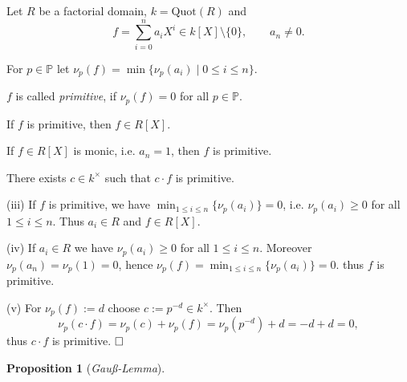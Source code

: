 \documentclass[11pt]{book}
\newtheorem{proposition}[theorem]{Proposition}
\theoremstyle{nonumberbreak}
\newenvironment{pr}[1][]{\ifthenelse{\equal{#1}{}}{\proof}{\proof[#1]}\rm}{\endproof}
\newenvironment{definprop}[1][]{\ifthenelse{\equal{#1}{}}{\definiprop}{\definiprop[#1]}\rm}{\enddefiniprop}
\begin{document}
\begin{spacing}{1.3}
\begin{definprop} %
Let $R$ be a factorial domain, $k=\textrm{Quot}(R)$ and $$f = \sum_{i=0}^n a_i X^{i} \in k[X] \setminus \{0\}, \qquad a_n \neq 0.$$
\begin{compactenum}
\item For $p \in \mathbb{P}$ let $\nu_p(f)= \min\{\nu_p(a_i) \mid 0 \leqslant i \leqslant n\}$.
\item $f$ is called \textit{primitive}, if $\nu_p(f)=0$ for all $p \in \mathbb{P}$. 
\item If $f$ is primitive, then $f \in R[X]$.
\item If $f \in R[X]$ is monic, i.e. $a_n=1$, then $f$ is primitive.
\item There exists $c \in k^{\times}$ such that $c \cdot f$ is primitive.
\end{compactenum}
\begin{pr}
\begin{compactenum}
\item[(iii)] If $f$ is primitive, we have $\min_{1\leqslant i \leqslant n}\{\nu_p(a_i)\}=0$, i.e. $\nu_p(a_i) \geqslant 0$ for all $1 \leqslant i \leqslant n$. Thus $a_i \in R$ and $f \in R[X]$.
\item[(iv)] If $a_i \in R$ we have $\nu_p(a_i) \geqslant 0$ for all $1 \leqslant i \leqslant n$. Moreover $\nu_p(a_n)=\nu_p(1)=0$, hence $\nu_p(f)=\min_{1\leqslant i \leqslant n}\{\nu_p(a_i)\}=0$. thus $f$ is primitive.
\item[(v)] For $\nu_p(f):=d$ choose $c:=p^{-d} \in k^{\times}$. Then 
$$\nu_p(c\cdot f)=\nu_p(c)+\nu_p(f)=\nu_p(p^{-d})+d=-d+d=0,$$
thus $c\cdot f$ is primitive. $\hfill \Box$
\end{compactenum}
\end{pr}
\end{definprop}


\begin{proposition}[\rm \it Gauß-Lemma]


\end{proposition}
\end{spacing}
\end{document}
